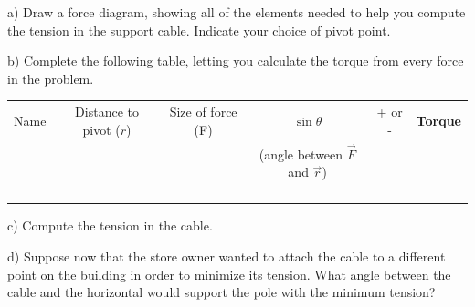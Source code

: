 \documentclass[12pt]{article}
\begin{document}
\bigskip
\bigskip

\newpage

a) Draw a force diagram, showing all of the elements needed to help you compute the tension in the support cable. Indicate
your choice of pivot point.

\vspace{5in}

\newpage

\begin{landscape}

b) Complete the following table, letting you calculate the torque from every force in the problem. 

\Large
\begin{center}
\begin{tabular}{|c|c|c|c|c|c|}
\hline
Name & Distance to pivot ($r$) & Size of force (F) & $\sin \theta$ & + or - & {\bf Torque} \\
     & & & (angle between $\vec F$ and $\vec r$) & & \\\hline
              &                         &                        &                                              &                    &                               \\ \hline
              &                         &                        &                                              &                    &                               \\ \hline
              &                         &                        &                                              &                    &                               \\ \hline
              &                         &                        &                                              &                    &                               \\ \hline
\end{tabular}
\end{center}
\normalsize
c) Compute the tension in the cable.

\vspace{3 in}

d) Suppose now that the store owner wanted to attach the cable to a different point on the building in order to minimize its tension. What angle between the
cable and the horizontal would support the pole with the minimum tension?
\end{landscape} \newpage



\Large
\centerline{}
\normalsize
\centerline{}
\end{document}
